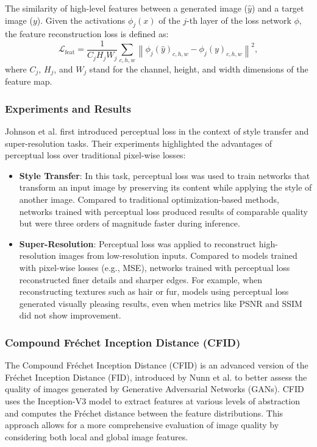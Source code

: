 \documentclass[a4paper,12pt]{article}
\begin{document}
The similarity of high-level features between a generated image (\(\hat{y}\)) and a target image (\(y\)). Given the activations \(\phi_j(x)\) of the \(j\)-th layer of the loss network \(\phi\), the feature reconstruction loss is defined as:
\[
\mathcal{L}_{\text{feat}} = \frac{1}{C_j H_j W_j} \sum_{c,h,w} \left\| \phi_j(\hat{y})_{c,h,w} - \phi_j(y)_{c,h,w} \right\|^2,
\]
where \(C_j\), \(H_j\), and \(W_j\) stand for the channel, height, and width dimensions of the feature map.

\subsubsection{Experiments and Results}

Johnson et al. \cite{johnson_perceptual_2016} first introduced perceptual loss in the context of style transfer and super-resolution tasks. Their experiments highlighted the advantages of perceptual loss over traditional pixel-wise losses:

\begin{itemize}
    \item \textbf{Style Transfer}: In this task, perceptual loss was used to train networks that transform an input image by preserving its content while applying the style of another image. Compared to traditional optimization-based methods, networks trained with perceptual loss produced results of comparable quality but were three orders of magnitude faster during inference.
    
    \item \textbf{Super-Resolution}: Perceptual loss was applied to reconstruct high-resolution images from low-resolution inputs. Compared to models trained with pixel-wise losses (e.g., MSE), networks trained with perceptual loss reconstructed finer details and sharper edges. For example, when reconstructing textures such as hair or fur, models using perceptual loss generated visually pleasing results, even when metrics like PSNR and SSIM did not show improvement.
\end{itemize}

\subsubsection{Compound Fréchet Inception Distance (CFID)}

The Compound Fréchet Inception Distance (CFID) is an advanced version of the Fréchet Inception Distance (FID), introduced by Nunn et al. \cite{nunn_compound_nodate} to better assess the quality of images generated by Generative Adversarial Networks (GANs). CFID uses the Inception-V3 model to extract features at various levels of abstraction and computes the Fréchet distance between the feature distributions. This approach allows for a more comprehensive evaluation of image quality by considering both local and global image features.
\end{document}
